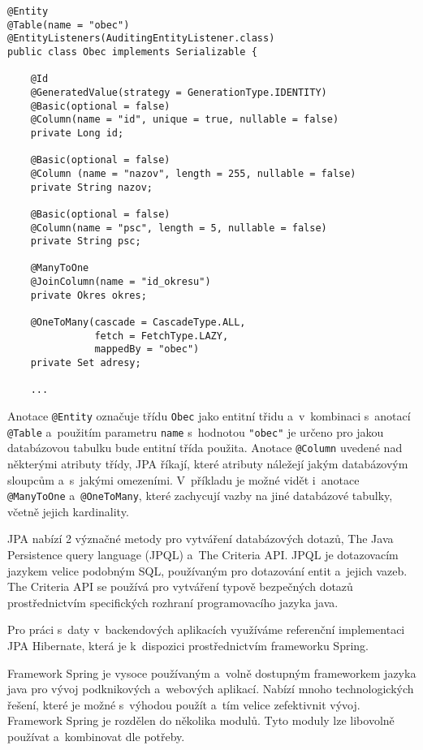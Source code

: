 \documentclass[12pt]{article}
\begin{document}
{\begin{lstlisting}
@Entity
@Table(name = "obec")
@EntityListeners(AuditingEntityListener.class)
public class Obec implements Serializable {

    @Id
    @GeneratedValue(strategy = GenerationType.IDENTITY)
    @Basic(optional = false)
    @Column(name = "id", unique = true, nullable = false)
    private Long id;
    
    @Basic(optional = false)
    @Column (name = "nazov", length = 255, nullable = false)
    private String nazov;
     
    @Basic(optional = false) 
    @Column(name = "psc", length = 5, nullable = false)
    private String psc; 
    
    @ManyToOne
    @JoinColumn(name = "id_okresu")  
    private Okres okres; 
    
    @OneToMany(cascade = CascadeType.ALL,
               fetch = FetchType.LAZY,
               mappedBy = "obec")   
    private Set adresy;
    
    ...
\end{lstlisting}

Anotace \texttt{@Entity} označuje třídu \texttt{Obec}
jako entitní třidu a~v~kombinaci s~anotací \texttt{@Table} 
a~použitím parametru \texttt{name} s~hodnotou \texttt{"obec"} je určeno pro jakou databázovou tabulku bude entitní třída použita.
Anotace \texttt{@Column} uvedené nad některými atributy třídy,
JPA říkají, které atributy náležejí jakým databázovým sloupcům a~s~jakými omezeními.
V~příkladu je možné vidět i~anotace \texttt{@ManyToOne} a~\texttt{@OneToMany},
které zachycují vazby na jiné databázové tabulky, včetně jejich kardinality.

JPA nabízí 2 význačné metody pro vytváření databázových dotazů, 
The Java Persistence query language (JPQL) a~The Criteria API.
JPQL je dotazovacím jazykem velice podobným SQL, používaným pro dotazování
entit a~jejich vazeb.
The Criteria API se používá pro vytváření typově bezpečných dotazů
prostřednictvím specifických rozhraní programovacího jazyka java.
\cite{oracleJPA}

Pro práci s~daty v~backendových aplikacích využíváme referenční implementaci 
JPA Hibernate, která je k~dispozici prostřednictvím frameworku Spring.


Framework Spring je vysoce používaným a~volně dostupným frameworkem
jazyka java pro vývoj podknikových a~webových aplikací.
Nabízí mnoho technologických řešení, které je možné s~výhodou
použít a~tím velice zefektivnit vývoj.
Framework Spring je rozdělen do několika modulů.
Tyto moduly lze libovolně používat a~kombinovat dle potřeby.

}
\end{document}
